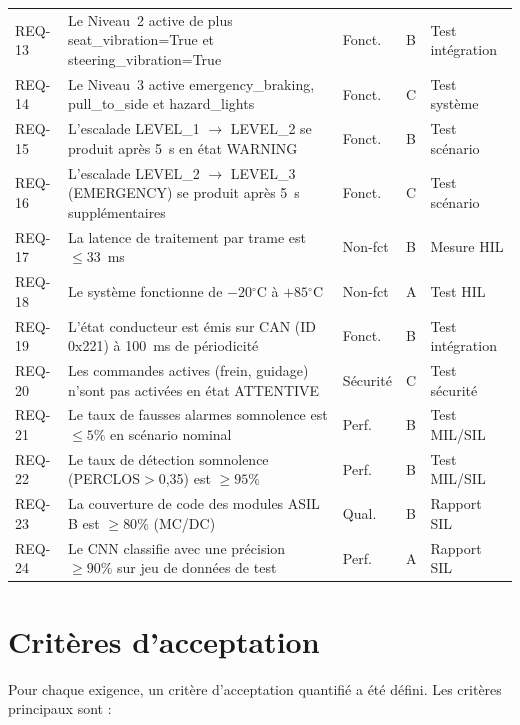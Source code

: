 \documentclass[12pt,a4paper]{report}
\newcommand{\degr}{\ensuremath{^{\circ}}}
\begin{document}
\begin{longtable}{C{1.4cm} L{5.5cm} C{1.3cm} C{1.2cm} L{3cm}}
REQ-13 & Le Niveau~2 active de plus seat\_vibration=True et steering\_vibration=True & Fonct. & B & Test int\'egration \\
REQ-14 & Le Niveau~3 active emergency\_braking, pull\_to\_side et hazard\_lights & Fonct. & C & Test syst\`eme \\
REQ-15 & L'escalade LEVEL\_1 $\to$ LEVEL\_2 se produit apr\`es 5~s en \'etat WARNING & Fonct. & B & Test sc\'enario \\
REQ-16 & L'escalade LEVEL\_2 $\to$ LEVEL\_3 (EMERGENCY) se produit apr\`es 5~s suppl\'ementaires & Fonct. & C & Test sc\'enario \\
REQ-17 & La latence de traitement par trame est $\leq 33$~ms & Non-fct & B & Mesure HIL \\
REQ-18 & Le syst\`eme fonctionne de $-20\degr$C \`a $+85\degr$C & Non-fct & A & Test HIL \\
REQ-19 & L'\'etat conducteur est \'emis sur CAN (ID 0x221) \`a 100~ms de p\'eriodicit\'e & Fonct. & B & Test int\'egration \\
REQ-20 & Les commandes actives (frein, guidage) n'sont pas activ\'ees en \'etat ATTENTIVE & S\'ecurit\'e & C & Test s\'ecurit\'e \\
REQ-21 & Le taux de fausses alarmes somnolence est $\leq 5\%$ en sc\'enario nominal & Perf. & B & Test MIL/SIL \\
REQ-22 & Le taux de d\'etection somnolence (PERCLOS$>$0,35) est $\geq 95\%$ & Perf. & B & Test MIL/SIL \\
REQ-23 & La couverture de code des modules ASIL B est $\geq 80\%$ (MC/DC) & Qual. & B & Rapport SIL \\
REQ-24 & Le CNN classifie avec une pr\'ecision $\geq 90\%$ sur jeu de donn\'ees de test & Perf. & A & Rapport SIL \\
\bottomrule
\end{longtable}

\section{Crit\`eres d'acceptation}

Pour chaque exigence, un crit\`ere d'acceptation quantifi\'e a \'et\'e d\'efini. Les crit\`eres principaux sont :
\end{document}
